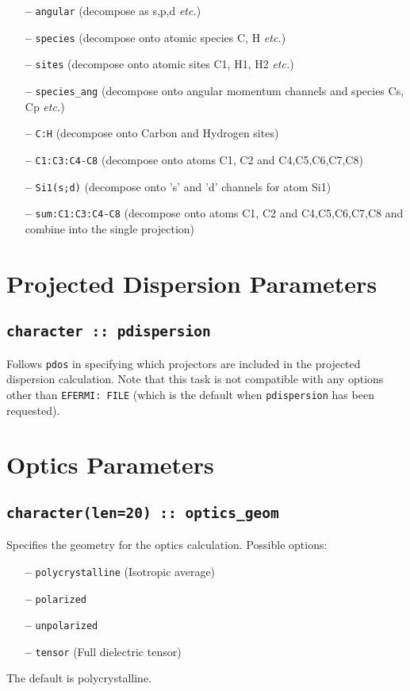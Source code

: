 \documentclass[a4paper,11pt,twoside]{book}
\begin{document}
{\begin{itemize}
\item[{\bf --}]  \verb#angular# (decompose as s,p,d \emph{etc.})
\item[{\bf --}]  \verb#species#    (decompose onto atomic species C, H \emph{etc.})
\item[{\bf --}]  \verb#sites#    (decompose onto atomic sites C1, H1, H2 \emph{etc.})
\item[{\bf --}]  \verb#species_ang#    (decompose onto angular momentum channels and species Cs, Cp \emph{etc.})
\item[{\bf --}]  \verb#C:H#     (decompose onto Carbon and Hydrogen sites)
\item[{\bf --}]  \verb#C1:C3:C4-C8#  (decompose onto atoms C1, C2 and C4,C5,C6,C7,C8)
\item[{\bf --}]  \verb#Si1(s;d)#     (decompose onto 's' and 'd' channels for
  atom Si1)
\item[{\bf --}]  \verb#sum:C1:C3:C4-C8#  (decompose onto atoms C1, C2 and C4,C5,C6,C7,C8 and combine into the single projection)

\end{itemize}

\section{Projected Dispersion Parameters}

\subsection[pdispersion]{\tt character :: pdispersion}
Follows \verb#pdos# in specifying which projectors are included in the projected
dispersion calculation. Note that this task is not compatible with any options
other than \verb#EFERMI: FILE# (which is the default when \verb#pdispersion# has
been requested).

\section{Optics Parameters}

\subsection[optics\_geom]{\tt character(len=20) :: optics\_geom}

Specifies the geometry for the optics calculation.  Possible options:
\begin{itemize}
\item[{\bf --}]  \verb#polycrystalline# (Isotropic average)
\item[{\bf --}]  \verb#polarized#
\item[{\bf --}]  \verb#unpolarized#
\item[{\bf --}]  \verb#tensor# (Full dielectric tensor)
\end{itemize}
The default is polycrystalline.

}
\end{document}
